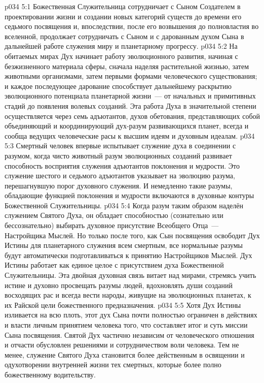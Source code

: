 \vs p034 5:1 Божественная Служительница сотрудничает с Сыном Создателем в проектировании жизни и создании новых категорий существ до времени его седьмого посвящения и, впоследствии, после его возвышения до полновластия во вселенной, продолжает сотрудничать с Сыном и с дарованным духом Сына в дальнейшей работе служения миру и планетарному прогрессу.
\vs p034 5:2 На обитаемых мирах Дух начинает работу эволюционного развития, начиная с безжизненного материала сферы, сначала наделяя растительной жизнью, затем животными организмами, затем первыми формами человеческого существования; и каждое последующее дарование способствует дальнейшему раскрытию эволюционного потенциала планетарной жизни~--- от начальных и примитивных стадий до появления волевых созданий. Эта работа Духа в значительной степени осуществляется через семь адъютантов, духов обетования, представляющих собой объединяющий и координирующий дух\hyp{}разум развивающихся планет, всегда и сообща ведущих человеческие расы к высшим идеям и духовным идеалам.
\vs p034 5:3 \pc Смертный человек впервые испытывает служение духа в соединении с разумом, когда чисто животный разум эволюционных созданий развивает способность восприятия служения адъютантов поклонения и мудрости. Это служение шестого и седьмого адъютантов указывает на эволюцию разума, перешагнувшую порог духовного служения. И немедленно такие разумы, обладающие функцией поклонения и мудрости включаются в духовные контуры Божественной Служительницы.
\vs p034 5:4 Когда разум таким образом наделён служением Святого Духа, он обладает способностью (сознательно или бессознательно) выбирать духовное присутствие Всеобщего Отца~--- Настройщика Мыслей. Но только после того, как Сын посвящения освободит Дух Истины для планетарного служения всем смертным, все нормальные разумы будут автоматически подготавливаться к принятию Настройщиков Мыслей. Дух Истины работает как единое целое с присутствием духа Божественной Служительницы. Эта двойная духовная связь витает над мирами, стремясь учить истине и духовно просвещать разумы людей, вдохновлять души созданий восходящих рас и всегда вести народы, живущие на эволюционных планетах, к их Райской цели божественного предназначения.
\vs p034 5:5 Хотя Дух Истины изливается на всю плоть, этот дух Сына почти полностью ограничен в действиях и власти личным принятием человека того, что составляет итог и суть миссии Сына посвящения. Святой Дух частично независим от человеческого отношения и отчасти обусловлен решениями и сотрудничеством воли человека. Тем не менее, служение Святого Духа становится более действенным в освящении и одухотворении внутренней жизни тех смертных, которые более полно  божественному водительству.
